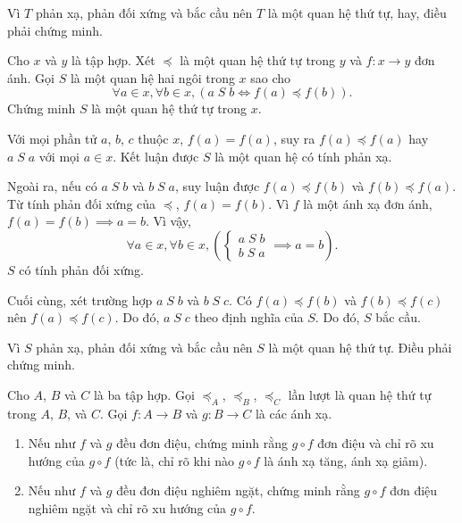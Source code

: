 Vì $T$ phản xạ, phản đối xứng và bắc cầu nên $T$ là một quan hệ thứ tự, hay, điều phải chứng minh.

\exercise Cho $x$ và $y$ là tập hợp. Xét $\preccurlyeq$ là một quan hệ thứ tự trong $y$ và $f: x \to y$ đơn ánh. Gọi $S$ là một quan hệ hai ngôi trong $x$ sao cho \begin{equation*}
   \forall a \in x, \forall b \in x, (a\;S\;b \iff f(a) \preccurlyeq f(b)).
\end{equation*}
Chứng minh $S$ là một quan hệ thứ tự trong $x$.

\solution

Với mọi phần tử $a$, $b$, $c$ thuộc $x$, $f(a) = f(a)$, suy ra $f(a) \preccurlyeq f(a)$ hay $a\;S\;a$ với mọi $a \in x$. Kết luận được $S$ là một quan hệ có tính phản xạ.

Ngoài ra, nếu có $a\;S\;b$ và $b\;S\;a$, suy luận được $f(a) \preccurlyeq f(b)$ và $f(b) \preccurlyeq f(a)$. Từ tính phản đối xứng của $\preccurlyeq$, $f(a) = f(b)$. Vì $f$ là một ánh xạ đơn ánh, $f(a) = f(b) \implies a = b$. Vì vậy, \begin{equation*}
   \forall a \in x, \forall b \in x, \left(\begin{cases}
      a\;S\;b \\
      b\;S\;a
   \end{cases}\implies a = b \right) .
\end{equation*}
$S$ có tính phản đối xứng.

Cuối cùng, xét trường hợp $a\;S\;b$ và $b\;S\;c$. Có $f(a) \preccurlyeq f(b)$ và $f(b) \preccurlyeq f(c)$ nên $f(a) \preccurlyeq f(c)$. Do đó, $a\;S\;c$ theo định nghĩa của $S$. Do đó, $S$ bắc cầu.

Vì $S$ phản xạ, phản đối xứng và bắc cầu nên $S$ là một quan hệ thứ tự. Điều phải chứng minh.

\exercise Cho $A$, $B$ và $C$ là ba tập hợp. Gọi $\preccurlyeq_A$, $\preccurlyeq_B$, $\preccurlyeq_C$ lần lượt là quan hệ thứ tự trong $A$, $B$, và $C$. Gọi $f: A \to B$ và $g: B \to C$ là các ánh xạ.

\begin{enumerate}
   \item Nếu như $f$ và $g$ đều đơn điệu, chứng minh rằng $g \circ f$ đơn điệu và chỉ rõ xu hướng của $g \circ f$ (tức là, chỉ rõ khi nào $g \circ f$ là ánh xạ tăng, ánh xạ giảm). 
   \item Nếu như $f$ và $g$ đều đơn điệu nghiêm ngặt, chứng minh rằng $g \circ f$ đơn điệu nghiêm ngặt và chỉ rõ xu hướng của $g \circ f$.
\end{enumerate} 

